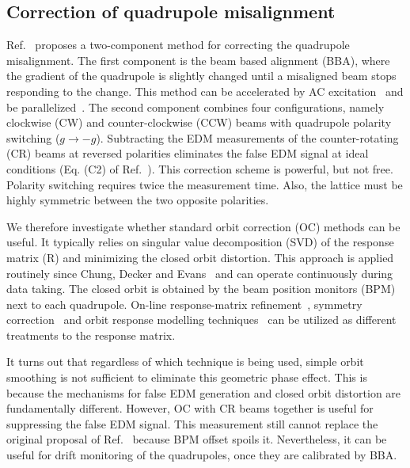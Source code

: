 \documentclass[aps,prab,reprint,superscriptaddress,nofootinbib]{revtex4-2}
\begin{document}
	\subsection{Correction of quadrupole misalignment}
	\label{sec:correction}
	Ref.~\cite{omarov} proposes a two-component method for correcting the quadrupole misalignment. The first component is the beam based alignment (BBA), where the gradient of the quadrupole is slightly changed until a misaligned beam stops responding to the change. This method can be accelerated by AC excitation~\cite{marti} and be parallelized~\cite{huang}.
	The second component combines four configurations, namely clockwise (CW) and counter-clockwise (CCW) beams with quadrupole polarity switching ($g \rightarrow -g$). Subtracting the EDM measurements of the counter-rotating (CR) beams at reversed polarities eliminates the false EDM signal at ideal conditions (Eq. (C2) of Ref.~\cite{omarov}). This correction scheme is powerful, but not free. Polarity switching requires twice the measurement time. Also, the lattice must be highly symmetric between the two opposite polarities.

	We therefore investigate whether standard orbit correction (OC) methods can be useful. It typically relies on singular value decomposition (SVD) of the response matrix (R) and minimizing the closed orbit distortion. This approach is applied routinely since Chung, Decker and Evans~\cite{chung1993} and can operate continuously during data taking. The closed orbit is obtained by the beam position monitors (BPM) next to each quadrupole. On-line response-matrix refinement~\cite{ziemann}, symmetry correction~\cite{mirza} and orbit response modelling techniques~\cite{wegscheider} can be utilized as different treatments to the response matrix.

	It turns out that regardless of which technique is being used, simple orbit smoothing is not sufficient to eliminate this geometric phase effect. This is because the mechanisms for false EDM generation and closed orbit distortion are fundamentally different. However, OC with CR beams together is useful for suppressing the false EDM signal. This measurement still cannot replace the original proposal of Ref.~\cite{omarov} because BPM offset spoils it. Nevertheless, it can be useful for drift monitoring of the quadrupoles, once they are calibrated by BBA.
\end{document}
